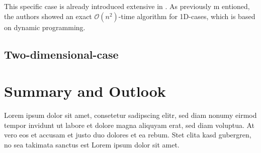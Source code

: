 \documentclass{acm_proc_article-sp}
\begin{document}
This specific case is already introduced extensive in \cite{helvig}. As previously m
entioned, the authors showed an exact $\mathcal{O}(n^2)$-time algorithm for 1D-cases, which is based on dynamic programming.












\subsection{Two-dimensional-case}





\section{Summary and Outlook}
Lorem ipsum dolor sit amet, consetetur sadipscing elitr, sed diam nonumy eirmod tempor invidunt ut labore et dolore magna aliquyam erat, sed diam voluptua. At vero eos et accusam et justo duo dolores et ea rebum. Stet clita kasd gubergren, no sea takimata sanctus est Lorem ipsum dolor sit amet.

{}

\end{document}
